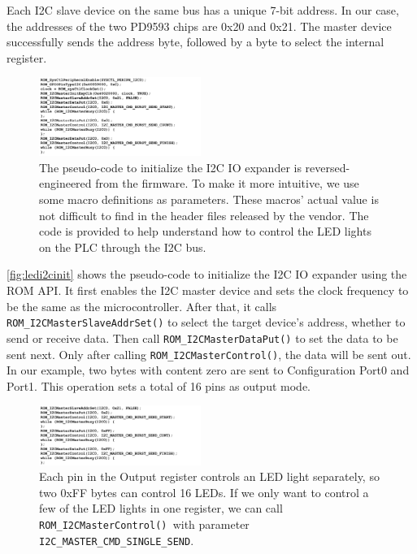 Each I2C slave device on the same bus has a unique 7-bit address. In our case, the addresses of the two PD9593 chips are 0x20 and 0x21. %
The master device successfully sends the address byte, followed by a byte to select the internal register. 




\begin{figure}[tp!]
	\includegraphics[width=0.47\textwidth]{figures/ledi2cinit}
	\centering
	\caption{The pseudo-code to initialize the I2C IO expander is reversed-engineered from the firmware. To make it more intuitive, we use some macro definitions as parameters. These macros' actual value is not difficult to find in the header files released by the vendor. The code is provided to help understand how to control the LED lights on the PLC through the I2C bus.}
	\label{fig:ledi2cinit}
\end{figure}


\autoref{fig:ledi2cinit} shows the pseudo-code to initialize the I2C IO expander using the ROM API. It first enables the I2C master device and sets the clock frequency to be the same as the microcontroller. After that, it calls \texttt{ROM\_I2CMasterSlaveAddrSet()} to select the target device's address, whether to send or receive data. Then call \texttt{ROM\_I2CMasterDataPut()} to set the data to be sent next. Only after calling \texttt{ROM\_I2CMasterControl()}, the data will be sent out. In our example, two bytes with content zero are sent to Configuration Port0 and Port1. This operation sets a total of 16 pins as output mode.

\begin{figure}[tp!]
	\includegraphics[width=0.47\textwidth]{figures/ledi2csend}
	\centering
	\caption{Each pin in the Output register controls an LED light separately, so two 0xFF bytes can control 16 LEDs. If we only want to control a few of the LED lights in one register, we can call \texttt{ROM\_I2CMasterControl() }with parameter \texttt{I2C\_MASTER\_CMD\_SINGLE\_SEND}.}
	\label{fig:ledi2csend}
\end{figure}

